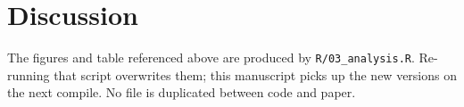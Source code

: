 \section{Discussion}

The figures and table referenced above are produced by
\texttt{R/03\_analysis.R}. Re-running that script overwrites them; this
manuscript picks up the new versions on the next compile. No file is
duplicated between code and paper.
